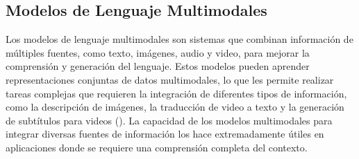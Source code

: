 \subsection{Modelos de Lenguaje Multimodales}
Los modelos de lenguaje multimodales son sistemas que combinan información de múltiples fuentes, como texto, imágenes, audio y video, para mejorar la comprensión y generación del lenguaje. Estos modelos pueden aprender representaciones conjuntas de datos multimodales, lo que les permite realizar tareas complejas que requieren la integración de diferentes tipos de información, como la descripción de imágenes, la traducción de video a texto y la generación de subtítulos para videos (\cite{baltruvsaitis2018multimodal}). La capacidad de los modelos multimodales para integrar diversas fuentes de información los hace extremadamente útiles en aplicaciones donde se requiere una comprensión completa del contexto.

